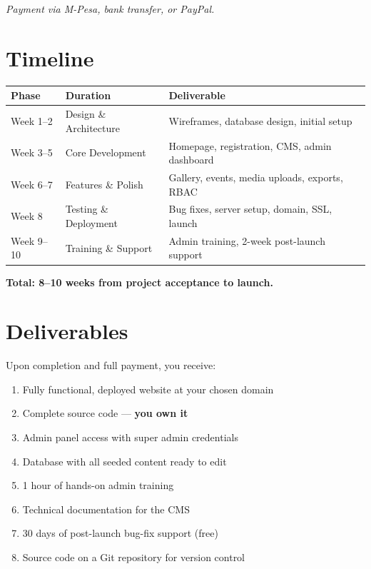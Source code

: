 \documentclass[12pt,a4paper]{article}
\begin{document}
\vspace{0.5em}
\textit{Payment via M-Pesa, bank transfer, or PayPal.}

\section{Timeline}

\begin{tabularx}{\textwidth}{p{2.5cm}p{3cm}X}
    \toprule
    \textbf{Phase} & \textbf{Duration} & \textbf{Deliverable} \\
    \midrule
    Week 1--2 & Design \& Architecture & Wireframes, database design, initial setup \\
    Week 3--5 & Core Development & Homepage, registration, CMS, admin dashboard \\
    Week 6--7 & Features \& Polish & Gallery, events, media uploads, exports, RBAC \\
    Week 8 & Testing \& Deployment & Bug fixes, server setup, domain, SSL, launch \\
    Week 9--10 & Training \& Support & Admin training, 2-week post-launch support \\
    \bottomrule
\end{tabularx}

\vspace{0.5em}
\textbf{Total: 8--10 weeks from project acceptance to launch.}

\section{Deliverables}

Upon completion and full payment, you receive:

\begin{enumerate}[leftmargin=1.5em]
    \item Fully functional, deployed website at your chosen domain
    \item Complete source code --- \textbf{you own it}
    \item Admin panel access with super admin credentials
    \item Database with all seeded content ready to edit
    \item 1 hour of hands-on admin training
    \item Technical documentation for the CMS
    \item 30 days of post-launch bug-fix support (free)
    \item Source code on a Git repository for version control
\end{enumerate}
\end{document}
